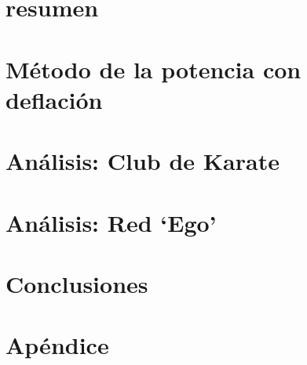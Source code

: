 


 



\section*{resumen}

\vspace{2em}

\tableofcontents
\newpage

\section{Método de la potencia con deflación}

\newpage


% 

\section{Análisis: Club de Karate}

\newpage

\section{Análisis: Red `Ego'}

\newpage

\section{Conclusiones}

\newpage

\section{Apéndice}

\newpage



